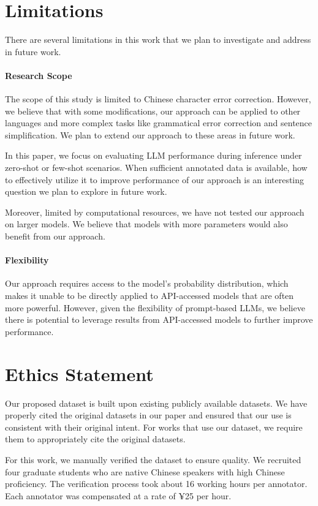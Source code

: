 \section*{Limitations}
There are several limitations in this work that we plan to investigate and address in future work.

\paragraph{Research Scope}
The scope of this study is limited to Chinese character error correction. However, we believe that with some modifications, our approach can be applied to other languages and more complex tasks like grammatical error correction and sentence simplification.
We plan to extend our approach to these areas in future work.

In this paper, we focus on evaluating LLM performance during inference under zero-shot or few-shot scenarios.
When sufficient annotated data is available, how to effectively utilize it to improve performance of our approach is an interesting question we plan to explore in future work.

Moreover, limited by computational resources, we have not tested our approach on larger models.
We believe that models with more parameters would also benefit from our approach.

\paragraph{Flexibility}
Our approach requires access to the model's probability distribution, which makes it unable to be directly applied to API-accessed models that are often more powerful.
However, given the flexibility of prompt-based LLMs, we believe there is potential to leverage results from API-accessed models to further improve performance.

\section*{Ethics Statement}
Our proposed dataset is built upon existing publicly available datasets. We have properly cited the original datasets in our paper and ensured that our use is consistent with their original intent.
For works that use our dataset, we require them to appropriately cite the original datasets.

For this work, we manually verified the dataset to ensure quality.
We recruited four graduate students who are native Chinese speakers with high Chinese proficiency.
The verification process took about 16 working hours per annotator.
Each annotator was compensated at a rate of ¥25 per hour.

